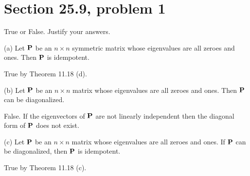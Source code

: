 \section{Section 25.9, problem 1}
True or False. Justify your answers.

\bigskip
\noindent
(a) Let $\bf P$ be an $n\times n$ symmetric matrix whose eigenvalues
are all zeroes and ones. Then $\bf P$ is idempotent.

\bigskip
\noindent
True by Theorem 11.18 (d).

\bigskip
\noindent
(b) Let $\bf P$ be an $n\times n$ matrix whose eigenvalues are
all zeroes and ones. Then $\bf P$ can be diagonalized.

\bigskip
\noindent
False.
If the eigenvectors of $\bf P$ are not linearly independent
then the diagonal form of $\bf P$ does not exist.

\bigskip
\noindent
(c) Let $\bf P$ be an $n\times n$ matrix whose eigenvalues are all
zeroes and ones. If $\bf P$ can be diagonalized, then $\bf P$ is
idempotent.

\bigskip
\noindent
True by Theorem 11.18 (c).


